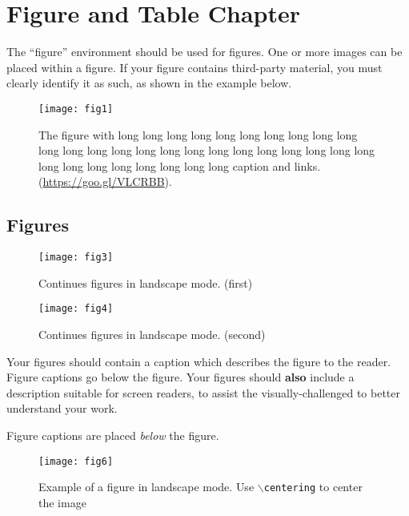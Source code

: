 \chapter{Figure and Table Chapter}

The ``figure'' environment should be used for figures. One or
more images can be placed within a figure. If your figure contains
third-party material, you must clearly identify it as such, as shown
in the example below.
\begin{figure}[h!]
	\centering
	\texttt{[image: fig1]}
	\caption{The figure with long long long long long long long long long long long long long long long long long long long long long long long long long long long long long long long long caption and links. (\url{https://goo.gl/VLCRBB}).}
\end{figure}
\lipsum[1]
\section{Figures}





\lipsum[1-2]
\begin{landscape} %
	\begin{figure}[h]
		\centering
		\texttt{[image: fig3]} 
		\caption{Continues figures in landscape mode. (first)}
	\end{figure}
	
	\begin{figure}[h]
		\centering
		\texttt{[image: fig4]}
		\caption{Continues figures in landscape mode. (second)}
	\end{figure}
\end{landscape}

Your figures should contain a caption which describes the figure to
the reader. Figure captions go below the figure. Your figures should
{\bfseries also} include a description suitable for screen readers, to
assist the visually-challenged to better understand your work.

Figure captions are placed {\itshape below} the figure.


\begin{landscape} %
	\begin{figure}[h]
		\centering
		\texttt{[image: fig6]}
		\caption{Example of a figure in landscape mode. Use \texttt{$\backslash$centering} to center the image}
	\end{figure}
\end{landscape}



